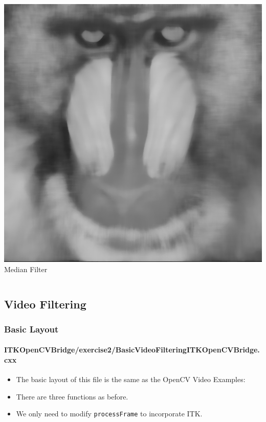 \begin{frame}
\begin{columns}[c]
\begin{center}
\includegraphics[width=1\textwidth]{../Art/OpenCVITKex1.png} \\
Median Filter
\end{center}
\end{columns}
\end{frame}


\subsection{Video Filtering}

\begin{frame}
\frametitle{Basic Layout}
\framesubtitle{ITKOpenCVBridge/exercise2/BasicVideoFilteringITKOpenCVBridge.cxx}
\begin{itemize}
\item The basic layout of this file is the same as the OpenCV Video
  Examples:
\item There are three functions as before.
\pause
\item We only need to modify {\tt processFrame} to incorporate ITK.
\end{itemize}
\end{frame}

